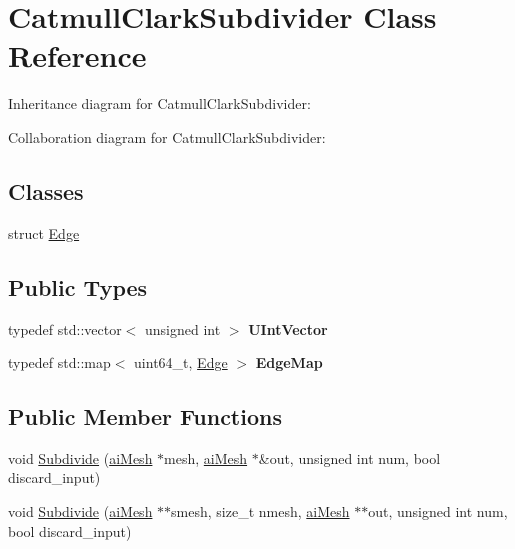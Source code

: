 \hypertarget{class_catmull_clark_subdivider}{\section{Catmull\+Clark\+Subdivider Class Reference}
\label{class_catmull_clark_subdivider}
}


Inheritance diagram for Catmull\+Clark\+Subdivider\+:


Collaboration diagram for Catmull\+Clark\+Subdivider\+:
\subsection*{Classes}
\begin{DoxyCompactItemize}
\item 
struct \hyperlink{struct_catmull_clark_subdivider_1_1_edge}{Edge}
\end{DoxyCompactItemize}
\subsection*{Public Types}
\begin{DoxyCompactItemize}
\item 
\hypertarget{class_catmull_clark_subdivider_a3334094909ed4b86204fff5560836e5d}{typedef std\+::vector$<$ unsigned int $>$ {\bfseries U\+Int\+Vector}}\label{class_catmull_clark_subdivider_a3334094909ed4b86204fff5560836e5d}

\item 
\hypertarget{class_catmull_clark_subdivider_ac50b5bbf588a9c5d2b81e17915a4b147}{typedef std\+::map$<$ uint64\+\_\+t, \hyperlink{struct_catmull_clark_subdivider_1_1_edge}{Edge} $>$ {\bfseries Edge\+Map}}\label{class_catmull_clark_subdivider_ac50b5bbf588a9c5d2b81e17915a4b147}

\end{DoxyCompactItemize}
\subsection*{Public Member Functions}
\begin{DoxyCompactItemize}
\item 
void \hyperlink{class_catmull_clark_subdivider_a3626843e8b19de31fd44d94487132c12}{Subdivide} (\hyperlink{structai_mesh}{ai\+Mesh} $\ast$mesh, \hyperlink{structai_mesh}{ai\+Mesh} $\ast$\&out, unsigned int num, bool discard\+\_\+input)
\item 
void \hyperlink{class_catmull_clark_subdivider_a26357a64f91c069d1b99d61fe98d15bf}{Subdivide} (\hyperlink{structai_mesh}{ai\+Mesh} $\ast$$\ast$smesh, size\+\_\+t nmesh, \hyperlink{structai_mesh}{ai\+Mesh} $\ast$$\ast$out, unsigned int num, bool discard\+\_\+input)
\end{DoxyCompactItemize}
